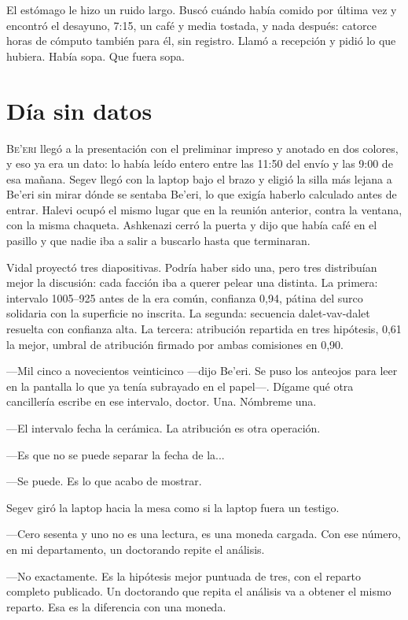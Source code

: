 El estómago le hizo un ruido largo. Buscó cuándo había comido por última vez y encontró el desayuno, 7:15, un café y media tostada, y nada después: catorce horas de cómputo también para él, sin registro. Llamó a recepción y pidió lo que hubiera. Había sopa. Que fuera sopa.

\clearpage

\chapter{Día sin datos}

\lettrine[lines=2, lhang=0.1, nindent=0.2em]{B}{e'eri} llegó a la presentación con el preliminar impreso y anotado en dos colores, y eso ya era un dato: lo había leído entero entre las 11:50 del envío y las 9:00 de esa mañana. Segev llegó con la laptop bajo el brazo y eligió la silla más lejana a Be'eri sin mirar dónde se sentaba Be'eri, lo que exigía haberlo calculado antes de entrar. Halevi ocupó el mismo lugar que en la reunión anterior, contra la ventana, con la misma chaqueta. Ashkenazi cerró la puerta y dijo que había café en el pasillo y que nadie iba a salir a buscarlo hasta que terminaran.


Vidal proyectó tres diapositivas. Podría haber sido una, pero tres distribuían mejor la discusión: cada facción iba a querer pelear una distinta. La primera: intervalo 1005--925 antes de la era común, confianza 0,94, pátina del surco solidaria con la superficie no inscrita. La segunda: secuencia dalet-vav-dalet resuelta con confianza alta. La tercera: atribución repartida en tres hipótesis, 0,61 la mejor, umbral de atribución firmado por ambas comisiones en 0,90.

---Mil cinco a novecientos veinticinco ---dijo Be'eri. Se puso los anteojos para leer en la pantalla lo que ya tenía subrayado en el papel---. Dígame qué otra cancillería escribe en ese intervalo, doctor. Una. Nómbreme una.

---El intervalo fecha la cerámica. La atribución es otra operación.

---Es que no se puede separar la fecha de la...

---Se puede. Es lo que acabo de mostrar.

Segev giró la laptop hacia la mesa como si la laptop fuera un testigo.

---Cero sesenta y uno no es una lectura, es una moneda cargada. Con ese número, en mi departamento, un doctorando repite el análisis.

---No exactamente. Es la hipótesis mejor puntuada de tres, con el reparto completo publicado. Un doctorando que repita el análisis va a obtener el mismo reparto. Esa es la diferencia con una moneda.

